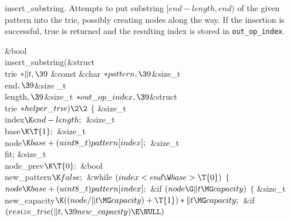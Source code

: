 insert\_substring.
Attempts to put substring $[end-length, end)$ of the given pattern into the
trie, possibly creating nodes along the
way. If the insertion is successful, true is returned and the resulting index
is stored in {\tt out\_op\_index}.

\Y\B\1\1\&{bool} \\{insert\_substring}(\&{struct} \\{trie} ${}{*}\|t,\39{}$%
\&{const} \&{char} ${}{*}\\{pattern},\39{}$\&{size\_t} \\{end}${},\39{}$\&{size%
\_t} \\{length}${},\39{}$\&{size\_t} ${}{*}\\{out\_op\_index},\39{}$\&{struct} %
\\{trie} ${}{*}\\{helper\_trie})\2\2{}$\6
${}\{{}$\1\6
\&{size\_t} \\{index}${}\K\\{end}-\\{length};{}$\6
\&{size\_t} \\{base}${}\K\T{1};{}$\6
\&{size\_t} \\{node}${}\K\\{base}+(\\{uint8\_t})\\{pattern}[\\{index}];{}$\6
\&{size\_t} \\{fit};\6
\&{size\_t} \\{node\_prev}${}\K\T{0};{}$\6
\&{bool} \\{new\_pattern}${}\K\\{false};{}$\7
\&{while} ${}(\\{index}<\\{end}\W\\{base}>\T{0}){}$\5
${}\{{}$\1\6
${}\\{node}\K\\{base}+(\\{uint8\_t})\\{pattern}[\\{index}];{}$\6
\&{if} ${}(\\{node}\G\|t\MG\\{capacity}){}$\5
${}\{{}$\1\6
\&{size\_t} \\{new\_capacity}${}\K((\\{node}/\|t\MG\\{capacity})+\T{1})*\|t\MG%
\\{capacity};{}$\7
\&{if} ${}(\\{resize\_trie}(\|t,\39\\{new\_capacity})\E\NULL){}$\5
